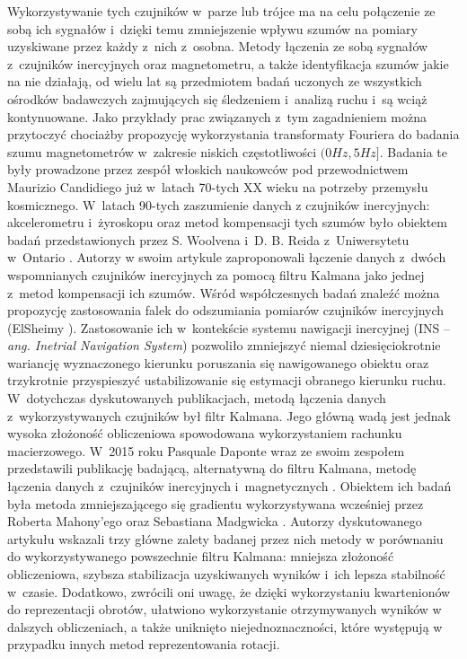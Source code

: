 Wykorzystywanie tych czujników w~parze lub trójce ma na celu połączenie ze sobą ich sygnałów i~dzięki temu zmniejszenie wpływu szumów na pomiary uzyskiwane przez każdy z~nich z~osobna. Metody łączenia ze sobą sygnałów z~czujników inercyjnych oraz magnetometru, a także identyfikacja szumów jakie na nie działają, od wielu lat są przedmiotem badań uczonych ze wszystkich ośrodków badawczych zajmujących się śledzeniem i~analizą ruchu i~są wciąż kontynuowane. Jako przykłady prac związanych z~tym zagadnieniem można przytoczyć chociażby propozycję wykorzystania transformaty Fouriera do badania szumu magnetometrów w~zakresie niskich częstotliwości $(0Hz, 5Hz]$\cite{Candidi1974}. Badania te były prowadzone przez zespół włoskich naukowców pod przewodnictwem Maurizio Candidiego już w~latach 70-tych XX wieku na potrzeby przemysłu kosmicznego. W~latach 90-tych zaszumienie danych z czujników inercyjnych: akcelerometru i~żyroskopu oraz metod kompensacji tych szumów było obiektem badań przedstawionych przez S. Woolvena i~D. B. Reida z~Uniwersytetu w~Ontario \cite{Woolven1994}. Autorzy w swoim artykule zaproponowali łączenie danych z~dwóch wspomnianych czujników inercyjnych za pomocą filtru Kalmana jako jednej z~metod kompensacji ich szumów. Wśród współczesnych badań znaleźć można propozycję zastosowania falek do odszumiania pomiarów czujników inercyjnych (ElSheimy \cite{ElSheimy2004}). Zastosowanie ich w~kontekście systemu nawigacji inercyjnej (INS -- \emph{ang. Inetrial Navigation System}) pozwoliło zmniejszyć niemal dziesięciokrotnie wariancję wyznaczonego kierunku poruszania się nawigowanego obiektu oraz trzykrotnie przyspieszyć ustabilizowanie się estymacji obranego kierunku ruchu. W~dotychczas dyskutowanych publikacjach, metodą łączenia danych z~wykorzystywanych czujników był filtr Kalmana. Jego główną wadą jest jednak wysoka złożoność obliczeniowa spowodowana wykorzystaniem rachunku macierzowego. W~2015 roku Pasquale Daponte wraz ze swoim zespołem przedstawili publikację badającą, alternatywną do filtru Kalmana, metodę łączenia danych z~czujników inercyjnych i~magnetycznych \cite{Daponte2015}. Obiektem ich badań była metoda zmniejszającego się gradientu wykorzystywana wcześniej przez Roberta Mahony'ego \cite{Mahony2005a} oraz Sebastiana Madgwicka \cite{Madgwick2011}. Autorzy dyskutowanego artykułu wskazali trzy główne zalety badanej przez nich metody w porównaniu do wykorzystywanego powszechnie filtru Kalmana: mniejsza złożoność obliczeniowa, szybsza stabilizacja uzyskiwanych wyników i~ich lepsza stabilność w~czasie. Dodatkowo, zwrócili oni uwagę, że dzięki wykorzystaniu kwartenionów do reprezentacji obrotów, ułatwiono wykorzystanie otrzymywanych wyników w dalszych obliczeniach, a także uniknięto niejednoznaczności, które występują w przypadku innych metod reprezentowania rotacji.

